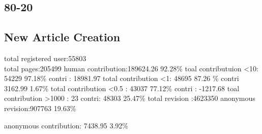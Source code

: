 \documentclass{elsarticle}
\begin{document}
\subsection{80-20}
\label{sec:80-20}

\subsection{New Article Creation}
\label{sec:new-article-creation}



total registered user:55803 \\

total pages:205499
human contribution:189624.26 92.28\%
toal contributuion <10: 54229  97.18\%  contri : 18981.97
total contribution <1: 48695 87.26 \%  contri 3162.99 1.67\%
total contribution <0.5 : 43037 77.12\%  contri : -1217.68
toal contribution >1000 : 23  contri: 48303 25.47\%
total revision :4623350
anonymous revision:907763 19.63\%

anonymous contribution: 7438.95 3.92\%


\end{document}
